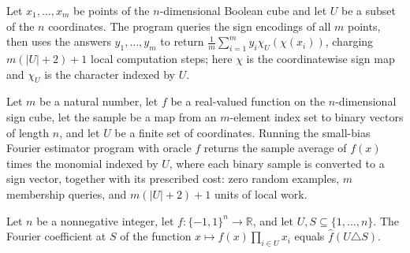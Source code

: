 \begin{definition}
\label{FABL.smallBiasFourierEstimatorProgram}
\leanok
{}
Let $x_1,\ldots,x_m$ be points of the $n$-dimensional Boolean cube and let $U$ be a
subset of the $n$ coordinates. The program queries the sign encodings of all $m$ points,
then uses the answers $y_1,\ldots,y_m$ to return $\frac{1}{m}\sum_{i=1}^m
y_i\chi_U(\chi(x_i))$, charging $m(|U|+2)+1$ local computation steps; here $\chi$ is the
coordinatewise sign map and $\chi_U$ is the character indexed by $U$.
\end{definition}

\begin{theorem}
\label{FABL.DeterministicQueryProgram.runWithCost_smallBiasFourierEstimatorProgram}
\leanok
{}
Let $m$ be a natural number, let $f$ be a real-valued function on the $n$-dimensional
sign cube, let the sample be a map from an $m$-element index set to binary vectors of
length $n$, and let $U$ be a finite set of coordinates. Running the small-bias Fourier
estimator program with oracle $f$ returns the sample average of $f(x)$ times the
monomial indexed by $U$, where each binary sample is converted to a sign vector,
together with its prescribed cost: zero random examples, $m$ membership queries, and
$m(|U|+2)+1$ units of local work.
\end{theorem}

\begin{theorem}
\label{FABL.fourierCoeff_pointwise_mul_monomial}
\leanok
{}
Let $n$ be a nonnegative integer, let $f:\{-1,1\}^n\to\mathbb R$, and let
$U,S\subseteq\{1,\ldots,n\}$. The Fourier coefficient at $S$ of the function
$x\mapsto f(x)\prod_{i\in U}x_i$ equals $\widehat f(U\triangle S)$.
\end{theorem}

